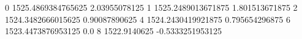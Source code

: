 0 1525.4869384765625 2.03955078125
1 1525.2489013671875 1.801513671875
2 1524.3482666015625 0.90087890625
4 1524.2430419921875 0.795654296875
6 1523.4473876953125 0.0
8 1522.9140625 -0.5333251953125
